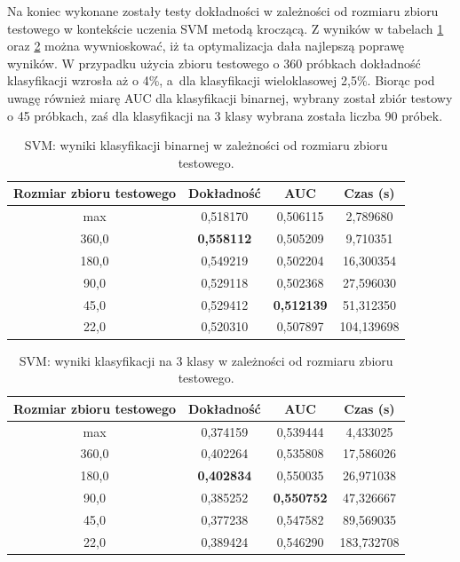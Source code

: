 \documentclass[a4paper, twoside, 11pt, openright]{article}
\begin{document}
Na koniec wykonane zostały testy dokładności w zależności od rozmiaru zbioru testowego w kontekście uczenia SVM metodą kroczącą. Z wyników w tabelach \ref{tab:svm_walk_forward_binary} oraz \ref{tab:svm_walk_forward_discrete} można wywnioskować, iż ta optymalizacja dała najlepszą poprawę wyników. W przypadku użycia zbioru testowego o 360 próbkach dokładność klasyfikacji wzrosła aż o 4\%, a~dla klasyfikacji wieloklasowej 2,5\%. Biorąc pod uwagę również miarę AUC dla klasyfikacji binarnej, wybrany został zbiór testowy o 45 próbkach, zaś dla klasyfikacji na 3 klasy wybrana została liczba 90 próbek.


\begin{table}[H]
    \centering
    \begin{tabular}{|c|c|c|c|}
    \hline
        \textbf{Rozmiar zbioru testowego} & \textbf{Dokładność} & \textbf{AUC} & \textbf{Czas (s)} \\ \hline
max                        &   0,518170 &  0,506115 &    2,789680 \\ \hline
360,0                         &  \textbf{0,558112} &  0,505209 &    9,710351 \\ \hline
180,0                         &  0,549219 &  0,502204 &   16,300354 \\ \hline
90,0                          &  0,529118 &  0,502368 &   27,596030 \\ \hline
45,0                          &  0,529412 &  \textbf{0,512139} &   51,312350 \\ \hline
22,0                          &  0,520310 &  0,507897 &  104,139698 \\ \hline

    \end{tabular}
    \caption{SVM: wyniki klasyfikacji binarnej w zależności od rozmiaru zbioru testowego.}
    \label{tab:svm_walk_forward_binary}
\end{table}



\begin{table}[H]
    \centering
    \begin{tabular}{|c|c|c|c|}
    \hline
        \textbf{Rozmiar zbioru testowego} & \textbf{Dokładność} & \textbf{AUC} & \textbf{Czas (s)} \\ \hline
max                       &  0,374159 &  0,539444 &    4,433025 \\ \hline
360,0                         &  0,402264 &  0,535808 &   17,586026 \\ \hline
180,0                         &  \textbf{0,402834} &  0,550035 &   26,971038 \\ \hline
90,0                          &  0,385252 &  \textbf{0,550752} &   47,326667 \\ \hline
45,0                          &  0,377238 &  0,547582 &   89,569035 \\ \hline
22,0                          &  0,389424 &  0,546290 &  183,732708 \\ \hline
    \end{tabular}
    \caption{SVM: wyniki klasyfikacji na 3 klasy w zależności od rozmiaru zbioru testowego.}
    \label{tab:svm_walk_forward_discrete}
\end{table}
    
\end{document}
